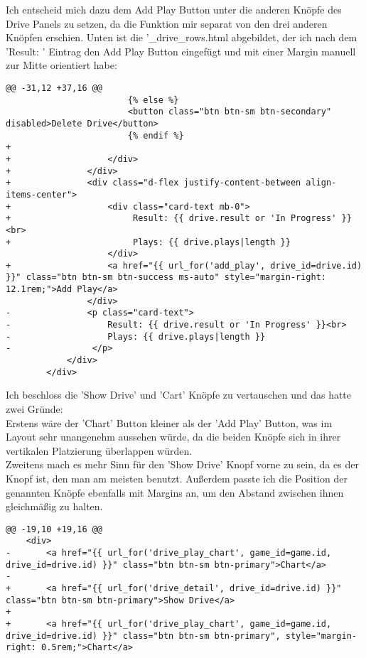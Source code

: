 Ich entscheid mich dazu dem Add Play Button unter die anderen Knöpfe des Drive Panels zu setzen, da die Funktion mir separat von den drei anderen Knöpfen erschien. Unten ist die '\_drive\_rows.html abgebildet, der ich nach dem 'Result: ' Eintrag den Add Play Button eingefügt und mit einer Margin manuell zur Mitte orientiert habe:
\begin{verbatim}
@@ -31,12 +37,16 @@
						{% else %}
						<button class="btn btn-sm btn-secondary" disabled>Delete Drive</button>
						{% endif %}
+                        
+                   </div>
+               </div>
+               <div class="d-flex justify-content-between align-items-center">
+                   <div class="card-text mb-0">
+                        Result: {{ drive.result or 'In Progress' }}<br>
+                        Plays: {{ drive.plays|length }}
					</div>
+                   <a href="{{ url_for('add_play', drive_id=drive.id) }}" class="btn btn-sm btn-success ms-auto" style="margin-right: 12.1rem;">Add Play</a>
				</div>
-               <p class="card-text">
-                   Result: {{ drive.result or 'In Progress' }}<br>
-                   Plays: {{ drive.plays|length }}
-                </p>
			</div>
		</div>
\end{verbatim}

Ich beschloss die 'Show Drive' und 'Cart' Knöpfe zu vertauschen und das hatte zwei Gründe: \\
Erstens wäre der 'Chart' Button kleiner als der 'Add Play' Button, was im Layout sehr unangenehm aussehen würde, da die beiden Knöpfe sich in ihrer vertikalen Platzierung überlappen würden. \\
Zweitens mach es mehr Sinn für den 'Show Drive' Knopf vorne zu sein, da es der Knopf ist, den man am meisten benutzt. 
Außerdem passte ich die Position der genannten Knöpfe ebenfalls mit Margins an, um den Abstand zwischen ihnen gleichmäßig zu halten.

\begin{verbatim}
@@ -19,10 +19,16 @@
	<div>
-		<a href="{{ url_for('drive_play_chart', game_id=game.id, drive_id=drive.id) }}" class="btn btn-sm btn-primary">Chart</a>
-                        
+ 		<a href="{{ url_for('drive_detail', drive_id=drive.id) }}" class="btn btn-sm btn-primary">Show Drive</a>
+                        
+		<a href="{{ url_for('drive_play_chart', game_id=game.id, drive_id=drive.id) }}" class="btn btn-sm btn-primary", style="margin-right: 0.5rem;">Chart</a>
\end{verbatim}


